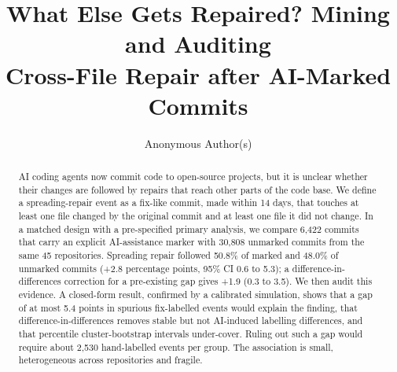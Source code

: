 \documentclass[runningheads]{llncs}
\begin{document}
%
\title{What Else Gets Repaired? Mining and Auditing\\ Cross-File Repair after AI-Marked Commits}
\author{Anonymous Author(s)}
%
\maketitle
%
\begin{abstract}
AI coding agents now commit code to open-source projects, but it is unclear whether their changes are followed by repairs that reach other parts of the code base. We define a spreading-repair event as a fix-like commit, made within 14 days, that touches at least one file changed by the original commit and at least one file it did not change. In a matched design with a pre-specified primary analysis, we compare 6,422 commits that carry an explicit AI-assistance marker with 30,808 unmarked commits from the same 45 repositories. Spreading repair followed 50.8\% of marked and 48.0\% of unmarked commits (+2.8 percentage points, 95\% CI 0.6 to 5.3); a difference-in-differences correction for a pre-existing gap gives +1.9 (0.3 to 3.5). We then audit this evidence. A closed-form result, confirmed by a calibrated simulation, shows that a gap of at most 5.4 points in spurious fix-labelled events would explain the finding, that difference-in-differences removes stable but not AI-induced labelling differences, and that percentile cluster-bootstrap intervals under-cover. Ruling out such a gap would require about 2,530 hand-labelled events per group. The association is small, heterogeneous across repositories and fragile.

\end{abstract}
%
%
\end{document}
